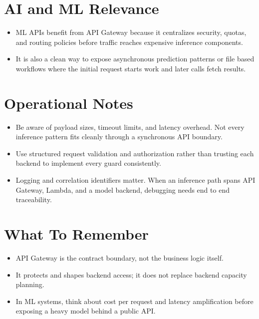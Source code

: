 \documentclass[10pt,twocolumn]{article}
\begin{document}
\section*{AI and ML Relevance}
\begin{itemize}
\item ML APIs benefit from API Gateway because it centralizes security, quotas, and routing policies before traffic reaches expensive inference components.
\item It is also a clean way to expose asynchronous prediction patterns or file based workflows where the initial request starts work and later calls fetch results.
\end{itemize}

\section*{Operational Notes}
\begin{itemize}
\item Be aware of payload sizes, timeout limits, and latency overhead. Not every inference pattern fits cleanly through a synchronous API boundary.
\item Use structured request validation and authorization rather than trusting each backend to implement every guard consistently.
\item Logging and correlation identifiers matter. When an inference path spans API Gateway, Lambda, and a model backend, debugging needs end to end traceability.
\end{itemize}

\section*{What To Remember}
\begin{itemize}
\item API Gateway is the contract boundary, not the business logic itself.
\item It protects and shapes backend access; it does not replace backend capacity planning.
\item In ML systems, think about cost per request and latency amplification before exposing a heavy model behind a public API.
\end{itemize}
\end{document}
